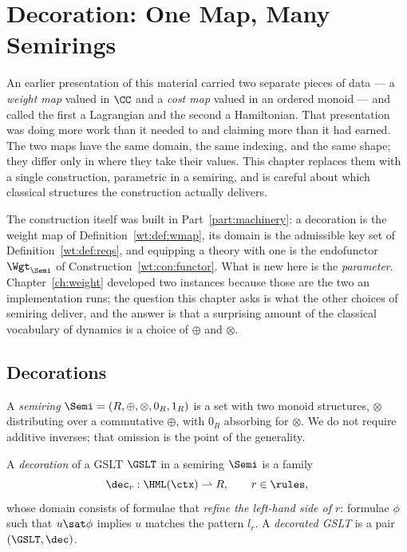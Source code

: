 \chapter{Decoration: One Map, Many Semirings}
\label{sec:weighted}

An earlier presentation of this material carried two separate pieces of
data --- a \emph{weight map} valued in $\CC$ and a \emph{cost map} valued
in an ordered monoid --- and called the first a Lagrangian and the second
a Hamiltonian.  That presentation was doing more work than it needed to
and claiming more than it had earned.  The two maps have the same domain,
the same indexing, and the same shape; they differ only in where they take
their values.  This chapter replaces them with a single construction,
parametric in a semiring, and is careful about which classical structures
the construction actually delivers.

The construction itself was built in Part~\ref{part:machinery}: a
decoration is the weight map of Definition~\ref{wt:def:wmap}, its domain
is the admissible key set of Definition~\ref{wt:def:reqs}, and equipping
a theory with one is the endofunctor $\Wgt_{\Semi}$ of
Construction~\ref{wt:con:functor}.  What is new here is the
\emph{parameter}.  Chapter~\ref{ch:weight} developed two instances
because those are the two an implementation runs; the question this
chapter asks is what the other choices of semiring deliver, and the
answer is that a surprising amount of the classical vocabulary of
dynamics is a choice of $\oplus$ and $\otimes$.

\section{Decorations}

\begin{definition}[Semiring]
A \emph{semiring} $\Semi = (R, \oplus, \otimes, 0_R, 1_R)$ is a set with
two monoid structures, $\otimes$ distributing over a commutative $\oplus$,
with $0_R$ absorbing for $\otimes$.  We do not require additive inverses;
that omission is the point of the generality.
\end{definition}

\begin{definition}[Decoration]
\label{def:decoration}
A \emph{decoration} of a GSLT $\GSLT$ in a semiring $\Semi$ is a family
\[
  \dec_r : \HML(\ctx) \rightharpoonup R, \qquad r \in \rules,
\]
whose domain consists of formulae that \emph{refine the left-hand side of
$r$}: formulae $\phi$ such that $u \sat \phi$ implies $u$ matches the
pattern $l_r$.  A \emph{decorated GSLT} is a pair $(\GSLT, \dec)$.
\end{definition}

